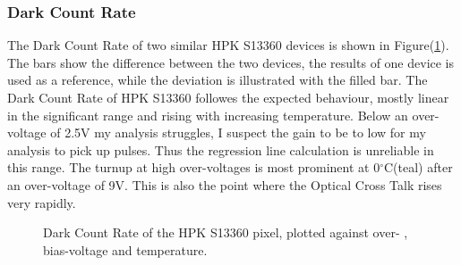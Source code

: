 \documentclass[article,type=msc,colorback,accentcolor=tud9c]{tudthesis}
\begin{document}
\subsubsection{Dark Count Rate}
The Dark Count Rate of two similar HPK S13360 devices is shown in Figure(\ref{fig:S13360_DCR}). The bars show the difference between the two devices, the results of one device is used as a reference, while the deviation is illustrated with the filled bar. The Dark Count Rate of HPK S13360 followes the expected behaviour, mostly linear in the significant range and rising with increasing temperature. Below an over-voltage of 2.5V my analysis struggles, I suspect the gain to be to low for my analysis to pick up pulses. Thus the regression line calculation is unreliable in this range. The turnup at high over-voltages is most prominent at 0$^{\circ}$C(teal) after an over-voltage of 9V. This is also the point where the Optical Cross Talk rises very rapidly.
\begin{figure}[h]
\begin{centering}
\caption{Dark Count Rate of the HPK S13360 pixel, plotted against over- , bias-voltage and temperature. }
\label{fig:S13360_DCR}
\end{centering}
\end{figure}

\end{document}
